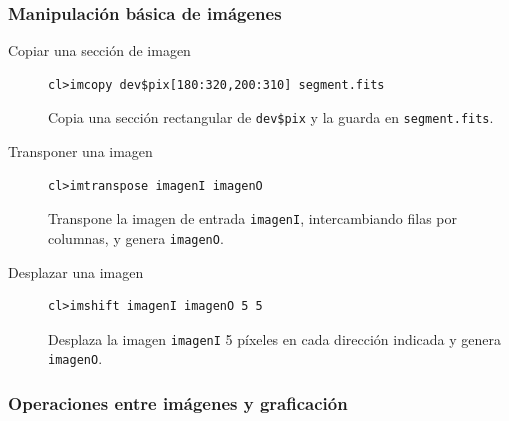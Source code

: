 \subsubsection*{Manipulación básica de imágenes}

\begin{description}

\item[Copiar una sección de imagen]
\begin{verbatim}
cl>imcopy dev$pix[180:320,200:310] segment.fits
\end{verbatim}
Copia una sección rectangular de \texttt{dev\$pix} y la guarda en \texttt{segment.fits}.

\item[Transponer una imagen]
\begin{verbatim}
cl>imtranspose imagenI imagenO
\end{verbatim}
Transpone la imagen de entrada \texttt{imagenI}, intercambiando filas por columnas, y genera \texttt{imagenO}.

\item[Desplazar una imagen]
\begin{verbatim}
cl>imshift imagenI imagenO 5 5
\end{verbatim}
Desplaza la imagen \texttt{imagenI} 5 píxeles en cada dirección indicada y genera \texttt{imagenO}.

\end{description}

\subsubsection*{Operaciones entre imágenes y graficación}


